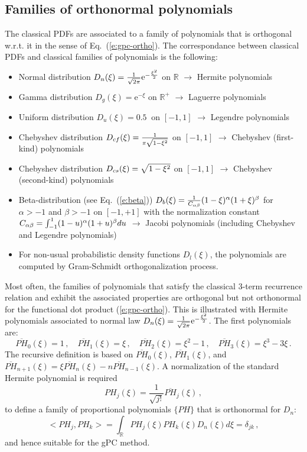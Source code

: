 \documentclass{eurosae}
\def\begit{\begin{itemize}}
\def\endit{\end{itemize}}
\newcommand{\Rset}{{\mathbb R}}
\newcommand{\iexp}{{\mathrm e}}
\newcommand{\eref}[1]{Eq.~(\ref{#1})}
\begin{document}
\subsection{Families of orthonormal polynomials}
%
The classical PDFs are associated to a family of polynomials that is orthogonal w.r.t. it in the sense of \eref{e:gpc-ortho}. The correspondance between classical PDFs and classical families of polynomials is the following: 
\begit
% 
 \item Normal distribution $\smash{D_n}(\xi)=\smash{\frac{1}{\sqrt{2\pi}} \iexp^{-\frac{\xi^2}{2}}}$ on $\Rset$ $\rightarrow$ Hermite polynomials
 \item Gamma distribution $D_g(\xi) = \iexp^{-\xi}$ on $\Rset^+$ $\rightarrow$  Laguerre polynomials
 \item Uniform distribution $D_u(\xi)=0.5~$ on $[-1,1]$ $\rightarrow$ Legendre polynomials
 \item Chebyshev distribution $\smash{D_{cf}}(\xi)=\smash{\frac{1}{\pi\sqrt{1-\xi^2}}}$ on $[-1,1]$ $\rightarrow$ Chebyshev (first-kind) polynomials 
 \item Chebyshev distribution $\smash{D_{cs}}(\xi)=\sqrt{1-\xi^2}$ on $[-1,1]$ $\rightarrow$ Chebyshev (second-kind) polynomials 
 \item Beta-distribution (see \eref{e:beta}) $\smash{D_b}(\xi) =\smash{ \frac{1}{C_{\alpha\beta}}(1-\xi)^\alpha(1+\xi)^\beta}$ for $ \alpha>-1$ and $\beta>-1$
 on $[-1,+1]$ with the normalization constant $\smash{C_{\alpha\beta}}=\smash{\int_{-1}^1(1-u)^\alpha(1+u)^\beta du}$ $\rightarrow$ Jacobi polynomials (including Chebyshev and Legendre polynomials)
 \item For non-usual probabilistic density functions $D_l(\xi)$, the polynomials are computed by Gram-Schmidt orthogonalization process.
%
\endit 
Most often, the families of polynomials that satisfy the classical 
3-term recurrence relation and exhibit the associated properties are orthogonal but not orthonormal
 for the functional dot product  (\ref{e:gpc-ortho}). This is illustrated with Hermite polynomials associated to normal law
 $D_n(\xi)=\smash{\frac{1}{\sqrt{2\pi}} \iexp^{-\frac{\xi^2}{2}}}$. The first polynomials are:
%
$$ \overline{PH}_0(\xi)=1\,,\quad\overline{PH}_1(\xi)=\xi\,,\quad\overline{PH}_2(\xi)=\xi^2-1\,,\quad\overline{PH}_3(\xi)=\xi^3-3\xi\,.$$
The recursive definition is based on $ \overline{PH}_0(\xi)$, $\overline{PH}_1(\xi)$, and $\overline{PH}_{n+1}(\xi) = \xi \overline{PH}_n(\xi) -n \overline{PH}_{n-1}(\xi) $.
%
 A normalization of the standard Hermite polynomial is required 
  $$ PH_j(\xi)=\frac{1}{\sqrt{ j!}} \overline{PH}_j(\xi)\,, $$
 to define a family of proportional polynomials $\{PH\}$ that is orthonormal for $ D_n$:  
 $$<PH_j,PH_k>=\int_\Rset PH_j(\xi)PH_k(\xi)D_n(\xi)d\xi = \delta_{jk}\,,$$
 and hence suitable for the gPC method. 
%
%
\end{document}
